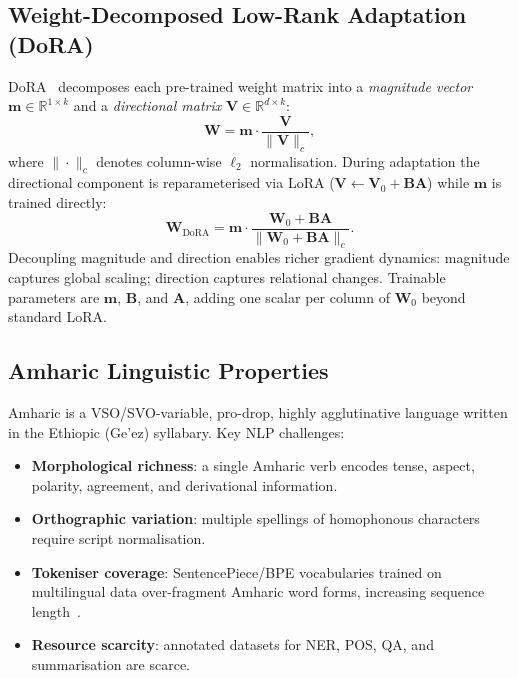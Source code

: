 \documentclass[11pt,a4paper]{article}
\begin{document}
\subsection{Weight-Decomposed Low-Rank Adaptation (DoRA)}

DoRA~\cite{Liu2024DoRA} decomposes each pre-trained weight matrix into
a \emph{magnitude vector} $\mathbf{m} \in \mathbb{R}^{1 \times k}$ and
a \emph{directional matrix} $\mathbf{V} \in \mathbb{R}^{d \times k}$:
\begin{equation}
  \mathbf{W} = \mathbf{m} \cdot \frac{\mathbf{V}}{\|\mathbf{V}\|_c},
  \label{eq:dora_decomp}
\end{equation}
where $\|\cdot\|_c$ denotes column-wise $\ell_2$ normalisation.
During adaptation the directional component is reparameterised via
LoRA ($\mathbf{V} \leftarrow \mathbf{V}_0 + \mathbf{BA}$) while
$\mathbf{m}$ is trained directly:
\begin{equation}
  \mathbf{W}_{\text{DoRA}} = \mathbf{m} \cdot
    \frac{\mathbf{W}_0 + \mathbf{B}\mathbf{A}}
         {\|\mathbf{W}_0 + \mathbf{B}\mathbf{A}\|_c}.
  \label{eq:dora_full}
\end{equation}
Decoupling magnitude and direction enables richer gradient dynamics:
magnitude captures global scaling; direction captures relational
changes.  Trainable parameters are $\mathbf{m}$, $\mathbf{B}$, and
$\mathbf{A}$, adding one scalar per column of $\mathbf{W}_0$ beyond
standard LoRA.

\subsection{Amharic Linguistic Properties}

Amharic is a VSO/SVO-variable, pro-drop, highly agglutinative
language written in the Ethiopic (Ge'ez) syllabary.  Key NLP challenges:
\begin{itemize}
  \item \textbf{Morphological richness}: a single Amharic verb encodes
        tense, aspect, polarity, agreement, and derivational
        information.
  \item \textbf{Orthographic variation}: multiple spellings of
        homophonous characters require script normalisation.
  \item \textbf{Tokeniser coverage}: SentencePiece/BPE vocabularies
        trained on multilingual data over-fragment Amharic word forms,
        increasing sequence length~\cite{Woldeyohannis2022}.
  \item \textbf{Resource scarcity}: annotated datasets for NER, POS,
        QA, and summarisation are scarce.
\end{itemize}
\end{document}
